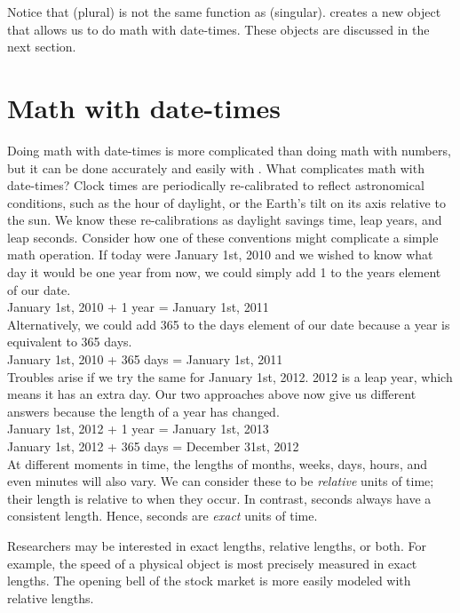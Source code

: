 \documentclass[article]{jss}
\begin{document}
Notice that  (plural) is not the same function as  (singular).  creates a new object that allows us to do math with date-times. These objects are discussed in the next section. 

\section{Math with date-times}
\label{sec:types}
Doing math with date-times is more complicated than doing math with numbers, but it can be done accurately and easily with . What complicates math with date-times? Clock times are periodically re-calibrated to reflect astronomical conditions, such as the hour of daylight, or the Earth's tilt on its axis relative to the sun. We know these re-calibrations as daylight savings time, leap years, and leap seconds. Consider how one of these conventions might complicate a simple math operation. If today were January 1st, 2010 and we wished to know what day it would be one year from now, we could simply add 1 to the years element of our date.\\

January 1st, 2010 + 1 year = January 1st, 2011\\

Alternatively, we could add 365 to the days element of our date because a year is equivalent to 365 days. \\

January 1st, 2010 + 365 days = January 1st, 2011\\

Troubles arise if we try the same for January 1st, 2012. 2012 is a leap year, which means it has an extra day. Our two approaches above now give us different answers because the length of a year has changed.\\ 

January 1st, 2012 + 1 year = January 1st, 2013\\
January 1st, 2012 + 365 days = December 31st,  2012\\

At different moments in time, the lengths of months, weeks, days, hours, and even minutes will also vary. We can consider these to be \emph{relative} units of time; their length is relative to when they occur. In contrast, seconds always have a consistent length. Hence, seconds are \emph{exact} units of time.

Researchers may be interested in exact lengths, relative lengths, or both. For example, the speed of a physical object is most precisely measured in exact lengths. The opening bell of the stock market is more easily modeled with relative lengths.
\end{document}
